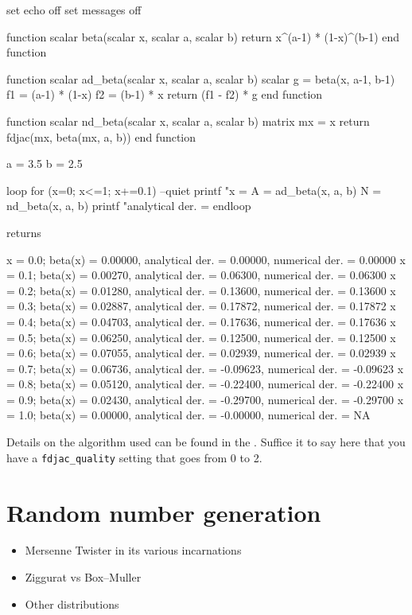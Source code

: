 \begin{code}
set echo off
set messages off

function scalar beta(scalar x, scalar a, scalar b)
    return x^(a-1) * (1-x)^(b-1)
end function

function scalar ad_beta(scalar x, scalar a, scalar b)
    scalar g = beta(x, a-1, b-1)
    f1 = (a-1) * (1-x)
    f2 = (b-1) * x
    return (f1 - f2) * g
end function

function scalar nd_beta(scalar x, scalar a, scalar b)
    matrix mx = {x}
    return fdjac(mx, beta(mx, a, b))
end function

a = 3.5
b = 2.5

loop for (x=0; x<=1; x+=0.1) --quiet
    printf "x = %
    A = ad_beta(x, a, b)
    N = nd_beta(x, a, b)
    printf "analytical der. = %
endloop
\end{code}

returns 

\begin{code}
x = 0.0; beta(x) = 0.00000, analytical der. =  0.00000, numerical der. =  0.00000
x = 0.1; beta(x) = 0.00270, analytical der. =  0.06300, numerical der. =  0.06300
x = 0.2; beta(x) = 0.01280, analytical der. =  0.13600, numerical der. =  0.13600
x = 0.3; beta(x) = 0.02887, analytical der. =  0.17872, numerical der. =  0.17872
x = 0.4; beta(x) = 0.04703, analytical der. =  0.17636, numerical der. =  0.17636
x = 0.5; beta(x) = 0.06250, analytical der. =  0.12500, numerical der. =  0.12500
x = 0.6; beta(x) = 0.07055, analytical der. =  0.02939, numerical der. =  0.02939
x = 0.7; beta(x) = 0.06736, analytical der. = -0.09623, numerical der. = -0.09623
x = 0.8; beta(x) = 0.05120, analytical der. = -0.22400, numerical der. = -0.22400
x = 0.9; beta(x) = 0.02430, analytical der. = -0.29700, numerical der. = -0.29700
x = 1.0; beta(x) = 0.00000, analytical der. = -0.00000, numerical der. =       NA
\end{code}

Details on the algorithm used can be found in the \GCR. Suffice it to
say here that you have a \texttt{fdjac\_quality} setting that goes
from 0 to 2.


\section{Random number generation}

\begin{itemize}
\item Mersenne Twister in its various incarnations
\item Ziggurat vs Box--Muller
\item Other distributions
\end{itemize}

